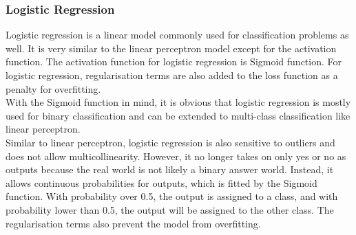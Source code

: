 \documentclass[10pt, a4paper, twocolumn]{article} %
\begin{document}
\subsubsection{Logistic Regression}
Logistic regression is a linear model commonly used for classification problems as well. It is very similar to the 
linear perceptron model except for the activation function. The activation function for logistic regression is Sigmoid function. 
For logistic regression, regularisation terms are also added to the loss function as a penalty for overfitting.\\[10pt]
With the Sigmoid function in mind, it is obvious that logistic regression is mostly used for binary classification and can 
be extended to multi-class classification like linear perceptron.\\[10pt]
Similar to linear perceptron, logistic regression is also sensitive to outliers and does not allow multicollinearity. However, it 
no longer takes on only yes or no as outputs because the real world is not likely a binary answer world. Instead, it allows 
continuous probabilities for outputs, which is fitted by the Sigmoid function. With probability over 0.5, the output is 
assigned to a class, and with probability lower than 0.5, the output will be assigned to the other class. The regularisation 
terms also prevent the model from overfitting.
\end{document}
